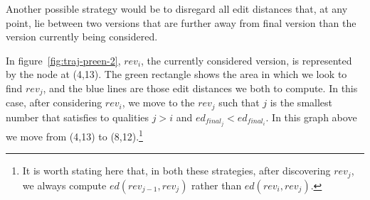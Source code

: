 Another possible strategy would be to disregard all edit distances
that, at any point, lie between two versions that are further away
from final version than the version currently being considered.

In figure~\ref{fig:traj-preen-2}, $rev_i$, the currently considered
version, is represented by the node at (4,13). The green rectangle
shows the area in which we look to find $rev_j$, and the blue lines
are those edit distances we both to compute. In this case, after
considering $rev_i$, we move to the $rev_j$ such that $j$ is the
smallest number that satisfies to qualities $j > i$ and $ed_{final_j}
< ed_{final_i}$. In this graph above we move from (4,13) to
(8,12).\footnote{It is worth stating here that, in both these
  strategies, after discovering $rev_j$, we always compute
  $ed(rev_{j-1}, rev_j)$ rather than $ed(rev_i,rev_j)$.}

